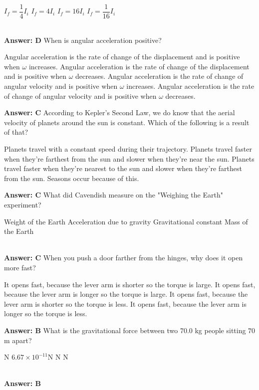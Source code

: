 \documentclass[13pt,addpoints]{exam}
\begin{document}
{{{\begin{questions}
					\begin{oneparchoices}
						\choice $I_f=\dfrac{1}{4}I_i$
						\choice $I_f=4I_i$
						\choice $I_f=16I_i$
						\choice $I_f=\dfrac{1}{16}I_i$
					\end{oneparchoices} \\
				\textbf{Answer: D}
					\question  When is angular acceleration positive?
					\begin{choices}
						\choice Angular acceleration is the rate of change of the
						displacement and is positive when $\omega$ increases.
						\choice Angular acceleration is the rate of change of the
						displacement and is positive when $\omega$ decreases.
						\choice Angular acceleration is the rate of change of angular
						velocity and is positive when $\omega$ increases.
						\choice Angular acceleration is the rate of change of angular
						velocity and is positive when $\omega$ decreases.
					\end{choices} 
				\textbf{Answer: C}
					\question According to Kepler's Second Law, we do know that the aerial velocity of planets around the sun is constant. Which of the following is  a result of that?
					\begin{choices}
						\choice Planets travel with a constant speed during their trajectory.
						\choice Planets travel faster when they're farthest from the sun and slower when they're near the sun.
						\choice Planets travel faster when they're nearest to the sun and slower when they're farthest from the sun.
						\choice Seasons occur because of this.
					\end{choices}
				\textbf{Answer: C}
					\question What did Cavendish measure on the "Weighing the Earth" experiment? \\
					\begin{oneparchoices}
						\choice Weight of the Earth
						\choice Acceleration due to gravity
						\choice Gravitational constant
						\choice Mass of the Earth
					\end{oneparchoices} \\
				\textbf{Answer: C}
					\question When you push a door farther from the hinges, why does it open more fast?
					\begin{choices}
						\choice It opens fast, because the lever arm is shorter so
						the torque is large.
						\choice It opens fast, because the lever arm is longer so the
						torque is large.
						\choice It opens fast, because the lever arm is shorter so
						the torque is less.
						\choice It opens fast, because the lever arm is longer so
						the torque is less.
					\end{choices}
				\textbf{Answer: B}
					\question What is the gravitational force between two 70.0 kg
					people sitting $70$ m apart? \\
					\begin{oneparchoices}
						\choice 1 N
						\choice $6.67\times10^{-11}$N
						\choice 70 N
						\choice 0 N
					\end{oneparchoices} \\
				\textbf{Answer: B}

\end{questions}}}}
\end{document}

